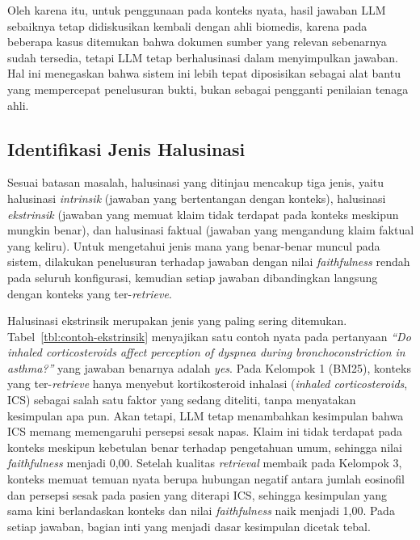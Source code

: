 Oleh karena itu, untuk penggunaan pada konteks nyata, hasil jawaban LLM sebaiknya tetap didiskusikan kembali dengan ahli biomedis, karena pada beberapa kasus ditemukan bahwa dokumen sumber yang relevan sebenarnya sudah tersedia, tetapi LLM tetap berhalusinasi dalam menyimpulkan jawaban. Hal ini menegaskan bahwa sistem ini lebih tepat diposisikan sebagai alat bantu yang mempercepat penelusuran bukti, bukan sebagai pengganti penilaian tenaga ahli.

\subsection{Identifikasi Jenis Halusinasi}
\label{subsec:identifikasi-halusinasi}

Sesuai batasan masalah, halusinasi yang ditinjau mencakup tiga jenis, yaitu halusinasi \textit{intrinsik} (jawaban yang bertentangan dengan konteks), halusinasi \textit{ekstrinsik} (jawaban yang memuat klaim tidak terdapat pada konteks meskipun mungkin benar), dan halusinasi faktual (jawaban yang mengandung klaim faktual yang keliru). Untuk mengetahui jenis mana yang benar-benar muncul pada sistem, dilakukan penelusuran terhadap jawaban dengan nilai \textit{faithfulness} rendah pada seluruh konfigurasi, kemudian setiap jawaban dibandingkan langsung dengan konteks yang ter-\textit{retrieve}.

Halusinasi ekstrinsik merupakan jenis yang paling sering ditemukan. Tabel~\ref{tbl:contoh-ekstrinsik} menyajikan satu contoh nyata pada pertanyaan \textit{``Do inhaled corticosteroids affect perception of dyspnea during bronchoconstriction in asthma?''} yang jawaban benarnya adalah \textit{yes}. Pada Kelompok 1 (BM25), konteks yang ter-\textit{retrieve} hanya menyebut kortikosteroid inhalasi (\textit{inhaled corticosteroids}, ICS) sebagai salah satu faktor yang sedang diteliti, tanpa menyatakan kesimpulan apa pun. Akan tetapi, LLM tetap menambahkan kesimpulan bahwa ICS memang memengaruhi persepsi sesak napas. Klaim ini tidak terdapat pada konteks meskipun kebetulan benar terhadap pengetahuan umum, sehingga nilai \textit{faithfulness} menjadi 0,00. Setelah kualitas \textit{retrieval} membaik pada Kelompok 3, konteks memuat temuan nyata berupa hubungan negatif antara jumlah eosinofil dan persepsi sesak pada pasien yang diterapi ICS, sehingga kesimpulan yang sama kini berlandaskan konteks dan nilai \textit{faithfulness} naik menjadi 1,00. Pada setiap jawaban, bagian inti yang menjadi dasar kesimpulan dicetak tebal.

